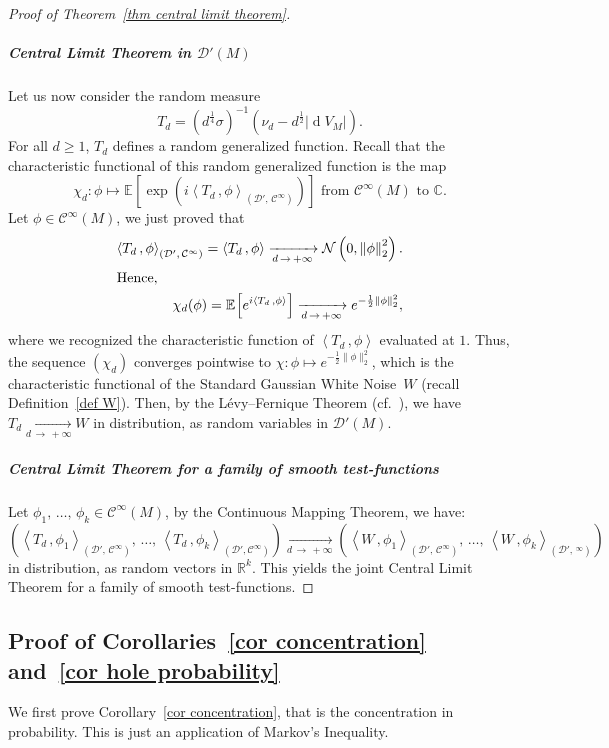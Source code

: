 \documentclass[AHL,Unicode,longabstracts,published]{cedram}
\DeclareMathOperator{\dmesure}{d}
\newcommand{\D}{\mathcal{D}}
\newcommand{\clN}{\mathcal{N}}
\newcommand{\clC}{\mathcal{C}}
\newcommand{\C}{\mathbb{C}}
\newcommand{\R}{\mathbb{R}}
\newcommand{\esp}[2][]{\mathbb{E}_{#1}\!\left[#2 \right]}
\newcommand{\norm}[1]{\left\lvert #1 \right\rvert}
\newcommand{\Norm}[1]{\left\lVert #1 \right\rVert}
\newcommand{\prsc}[2]{\left\langle #1\,, #2 \right\rangle}
\newcommand{\rmes}[1]{\norm{\dmesure\! V_{#1}}}
\renewcommand{\geq}{\geqslant}
\begin{document}
\begin{proof}[{Proof of Theorem~\ref{thm central limit theorem}}]
\subparagraph*{Central Limit Theorem in $\D'(M)$}
Let us now consider the random measure
\[
T_d = \left(d^\frac{1}{4}\sigma\right)^{-1} \left(\nu_d - d^\frac{1}{2}\rmes{M}\right).
\]
For all $d \geq 1$, $T_d$ defines a random generalized function. Recall that the characteristic functional of this random generalized function is the map
\[
\chi_d :\phi \mapsto \esp{\exp\left(i\prsc{T_d}{\phi}_{\left(\D',\,\clC^\infty\right)}\right)}\text{ from }\clC^\infty(M)\text{ to }\C.
\]
Let $\phi \in \clC^\infty(M)$, we just proved that
\begin{align*}
\prsc{T_d}{\phi}_{\left(\D',\,\clC^\infty\right)} = \prsc{T_d}{\phi} \xrightarrow[d\,\to\,+\infty]{} \clN\left(0,\Norm{\phi}_2^2\right).
\\
\intertext{Hence,}
\chi_d(\phi) = \esp{e^{i\prsc{T_d}{\phi}}} \xrightarrow[d \,\to \,+\infty]{} e^{-\frac{1}{2}\Norm{\phi}_2^2},
\end{align*}
where we recognized the characteristic function of $\prsc{T_d}{\phi}$ evaluated at $1$. Thus, the sequence $(\chi_d)$ converges pointwise to $\chi:\phi \mapsto e^{-\frac{1}{2}\|\phi\|_2^2}$, which is the characteristic functional of the Standard Gaussian White Noise~$W$ (recall Definition~\ref{def W}). Then, by the Lévy--Fernique Theorem (cf.~\cite[Theorem~III.6.5]{Fer1967}), we have $T_d \xrightarrow[d\, \to\,+\infty]{} W$ in distribution, as random variables in $\D'(M)$.

\subparagraph*{Central Limit Theorem for a family of smooth test-functions}
Let $\phi_1,\,\dots,\,\phi_k \in \clC^\infty(M)$, by the Continuous Mapping Theorem, we have:
\[
\left(\prsc{T_d}{\phi_1}_{\left(\D',\,\clC^\infty\right)},\,\dots,\,\prsc{T_d}{\phi_k}_{\left(\D',\clC^\infty\right)}\right) \xrightarrow[d\,\to\,+\infty]{} \left(\prsc{W}{\phi_1}_{\left(\D',\,\clC^\infty\right)},\,\dots,\,\prsc{W}{\phi_k}_{\left(\D',\,^\infty\right)}\right)
\]
in distribution, as random vectors in $\R^k$. This yields the joint Central Limit Theorem for a family of smooth test-functions.
\end{proof}



\subsection{Proof of Corollaries~\ref{cor concentration} and~\ref{cor hole probability}}\label{subsec proof of the corollaries}

We first prove Corollary~\ref{cor concentration}, that is the concentration in probability. This is just an application of Markov's Inequality.
\end{document}
